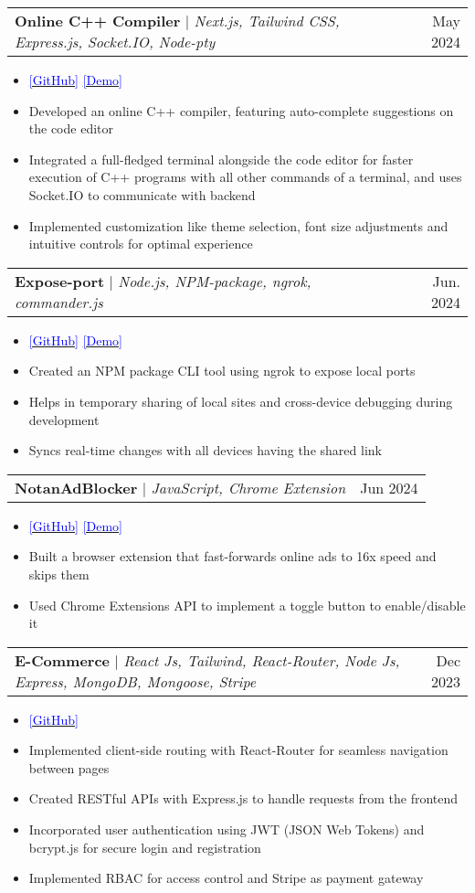 \documentclass[letterpaper,11pt]{article}
\makeatletter
\newcommand{\resumeItem}[1]{
  \item\small{
    {#1 \vspace{-2pt}}
  }
}
\newcommand{\resumeProjectHeading}[2]{
    \item
    \begin{tabular*}{0.97\textwidth}{l@{\extracolsep{\fill}}r}
      \small#1 & #2 \\
    \end{tabular*}\vspace{-7pt}
}
\newcommand{\bluehref}[2]{\href{#1}{\textcolor{blue}{#2}}}
\newcommand{\resumeItemListStart}{\begin{itemize}}
\newcommand{\resumeItemListEnd}{\end{itemize}\vspace{-5pt}}
\makeatother
\begin{document}
    \resumeProjectHeading
        {\textbf{Online C++ Compiler} $|$ \footnotesize\emph{Next.js, Tailwind CSS, Express.js, Socket.IO, Node-pty}}{May 2024}
        \resumeItemListStart
        \resumeItem{{\bluehref{https://github.com/Goutam-04/onlineIDE}{[GitHub]} \bluehref{https://online-cpp-compiler.vercel.app/}{[Demo]}}}
            \resumeItem{Developed an online C++ compiler, featuring auto-complete suggestions on the code editor}
            \resumeItem{Integrated a full-fledged terminal alongside the code editor for faster execution of C++ programs with all other commands of a terminal, and uses Socket.IO to communicate with backend}
            \resumeItem{Implemented customization like theme selection, font size adjustments and intuitive controls for optimal experience}
          \resumeItemListEnd


          \resumeProjectHeading
          {\textbf{Expose-port} $|$ \footnotesize\emph{Node.js, NPM-package, ngrok, commander.js}}{Jun. 2024}
          \resumeItemListStart
          \resumeItem{{\bluehref{https://github.com/Goutam-04/expose-port}{[GitHub]} \bluehref{https://www.npmjs.com/package/expose-port}{[Demo]}}}
              \resumeItem{Created an NPM package CLI tool using ngrok to expose local ports}
              \resumeItem{Helps in temporary sharing of local sites and cross-device debugging during development}
              \resumeItem{Syncs real-time changes with all devices having the shared link}
    
          \resumeItemListEnd

          \resumeProjectHeading
          {\textbf{NotanAdBlocker} $|$  \footnotesize\emph{JavaScript, Chrome Extension}}{Jun 2024}
          
              \resumeItemListStart
              \resumeItem{{\bluehref{https://github.com/Goutam-04/NotAnAdBlocker}{[GitHub]} \bluehref{https://not-an-ad-blocker.vercel.app/}{[Demo]}}}
      
              \resumeItem{Built a browser extension that fast-forwards online ads to 16x speed and skips them}
              \resumeItem{Used Chrome Extensions API to implement a toggle button to enable/disable it}
              
                \resumeItemListEnd

        
    

        \resumeProjectHeading
        {\textbf{E-Commerce} $|$ \footnotesize\emph{React Js, Tailwind, React-Router, Node Js, Express, MongoDB, Mongoose, Stripe}}{Dec 2023}
        \resumeItemListStart
        \resumeItem{{\bluehref{https://github.com/Goutam-04/E-Commerce}{[GitHub]}}}
            \resumeItem{Implemented client-side routing with React-Router for seamless navigation between pages}
            \resumeItem{Created RESTful APIs with Express.js to handle requests from the frontend}
            \resumeItem{Incorporated user authentication using JWT (JSON Web Tokens) and bcrypt.js for secure login and registration}
            \resumeItem{Implemented RBAC for access control and Stripe as payment gateway}
          \resumeItemListEnd
        
\end{document}
